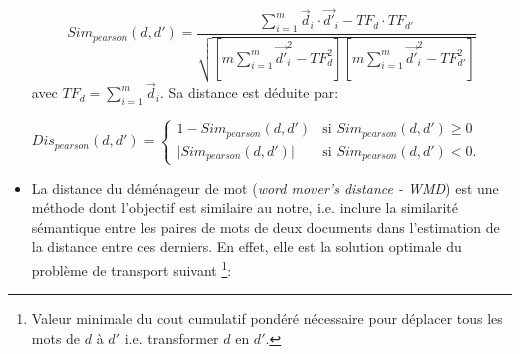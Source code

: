 \begin{itemize}
	\[Sim_{pearson}(d,d') = \frac{ \sum\limits^m_{i=1} \vec{d}_i \cdot \vec{d'}_i - TF_d\cdot TF_{d'}}{\sqrt{[m \sum\limits^m_{i=1} \vec{d'}_i^2 - TF^2_d][m \sum\limits^m_{i=1} \vec{d'}_i^2 - TF^2_{d'}]}}\]
avec $TF_d = \sum\limits^m_{i=1} \vec{d}_i$. Sa distance est déduite par:

$Dis_{pearson}(d,d') =
\left\{ \begin{array}{ll}
1 - Sim_{pearson}(d,d') & \text{si } Sim_{pearson}(d,d') \geq 0 \\
\vert Sim_{pearson}(d,d') \vert & \text{si } Sim_{pearson}(d,d') < 0.
\end{array}
\right.$
	\item \og La distance du déménageur de mot \fg{} (\textit{word mover's distance - WMD}) \citep{kusner2015wordmoverdist} est une méthode dont l'objectif est similaire au notre, i.e. inclure la similarité sémantique entre les paires de mots de deux documents dans l'estimation de la distance entre ces derniers. En effet, elle est la solution optimale du problème de transport suivant \footnote{Valeur minimale du cout cumulatif pondéré nécessaire pour déplacer  tous les mots de $d$ à $d'$ i.e. transformer $d$ en $d'$.}:
	

\end{itemize}
